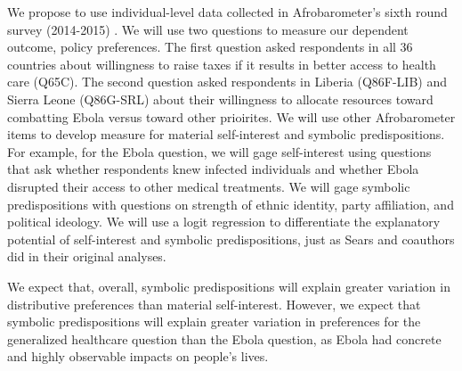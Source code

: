 \documentclass[]{article}
\begin{document}
We propose to use individual-level data collected in Afrobarometer's
sixth round survey (2014-2015) . We will use two questions to measure
our dependent outcome, policy preferences. The first question asked
respondents in all 36 countries about willingness to raise taxes if it
results in better access to health care (Q65C). The second question
asked respondents in Liberia (Q86F-LIB) and Sierra Leone (Q86G-SRL)
about their willingness to allocate resources toward combatting Ebola
versus toward other prioirites. We will use other Afrobarometer items to
develop measure for material self-interest and symbolic predispositions.
For example, for the Ebola question, we will gage self-interest using
questions that ask whether respondents knew infected individuals and
whether Ebola disrupted their access to other medical treatments. We
will gage symbolic predispositions with questions on strength of ethnic
identity, party affiliation, and political ideology. We will use a logit
regression to differentiate the explanatory potential of self-interest
and symbolic predispositions, just as Sears and coauthors did in their
original analyses.

We expect that, overall, symbolic predispositions will explain greater
variation in distributive preferences than material self-interest.
However, we expect that symbolic predispositions will explain greater
variation in preferences for the generalized healthcare question than
the Ebola question, as Ebola had concrete and highly observable impacts
on people's lives.
\end{document}
